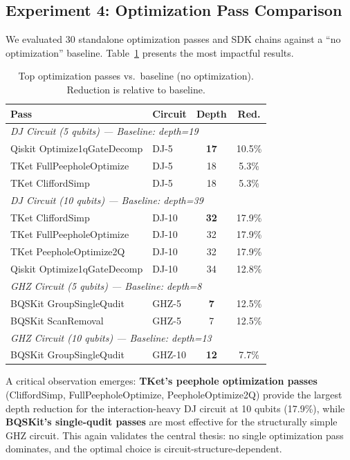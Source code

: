 \documentclass[conference]{IEEEtran}
\begin{document}
\subsection{Experiment 4: Optimization Pass Comparison}

We evaluated 30 standalone optimization passes and SDK chains against a ``no optimization'' baseline. Table~\ref{tab:optimization} presents the most impactful results.

\begin{table}[t]
\centering
\caption{Top optimization passes vs.\ baseline (no optimization). Reduction is relative to baseline.}
\label{tab:optimization}
\begin{tabular}{llcc}
\hline
\textbf{Pass} & \textbf{Circuit} & \textbf{Depth} & \textbf{Red.} \\
\hline
\multicolumn{4}{l}{\textit{DJ Circuit (5 qubits) --- Baseline: depth=19}} \\
Qiskit Optimize1qGateDecomp & DJ-5 & \textbf{17} & 10.5\% \\
TKet FullPeepholeOptimize & DJ-5 & 18 & 5.3\% \\
TKet CliffordSimp & DJ-5 & 18 & 5.3\% \\
\hline
\multicolumn{4}{l}{\textit{DJ Circuit (10 qubits) --- Baseline: depth=39}} \\
TKet CliffordSimp & DJ-10 & \textbf{32} & 17.9\% \\
TKet FullPeepholeOptimize & DJ-10 & 32 & 17.9\% \\
TKet PeepholeOptimize2Q & DJ-10 & 32 & 17.9\% \\
Qiskit Optimize1qGateDecomp & DJ-10 & 34 & 12.8\% \\
\hline
\multicolumn{4}{l}{\textit{GHZ Circuit (5 qubits) --- Baseline: depth=8}} \\
BQSKit GroupSingleQudit & GHZ-5 & \textbf{7} & 12.5\% \\
BQSKit ScanRemoval & GHZ-5 & 7 & 12.5\% \\
\hline
\multicolumn{4}{l}{\textit{GHZ Circuit (10 qubits) --- Baseline: depth=13}} \\
BQSKit GroupSingleQudit & GHZ-10 & \textbf{12} & 7.7\% \\
\hline
\end{tabular}
\end{table}

A critical observation emerges: \textbf{TKet's peephole optimization passes} (CliffordSimp, FullPeepholeOptimize, PeepholeOptimize2Q) provide the largest depth reduction for the interaction-heavy DJ circuit at 10 qubits (17.9\%), while \textbf{BQSKit's single-qudit passes} are most effective for the structurally simple GHZ circuit. This again validates the central thesis: no single optimization pass dominates, and the optimal choice is circuit-structure-dependent.
\end{document}

